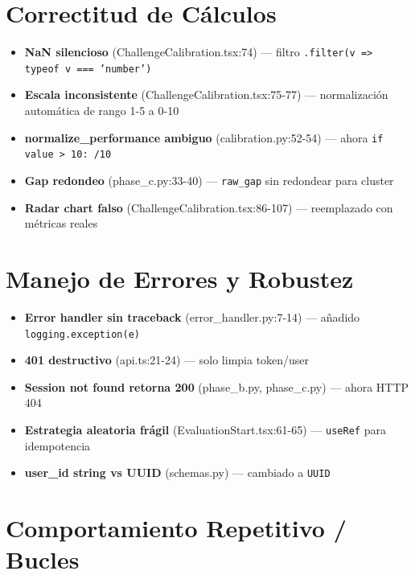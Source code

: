 \documentclass[12pt,a4paper]{article}
\begin{document}
\section{Correctitud de Cálculos}

\begin{itemize}
  \item[\textcolor{orange}{M}] \textbf{NaN silencioso} (ChallengeCalibration.tsx:74) --- filtro \texttt{.filter(v => typeof v === 'number')}
  \item[\textcolor{orange}{M}] \textbf{Escala inconsistente} (ChallengeCalibration.tsx:75-77) --- normalización automática de rango 1-5 a 0-10
  \item[\textcolor{orange}{M}] \textbf{normalize\_performance ambiguo} (calibration.py:52-54) --- ahora \texttt{if value > 10: /10}
  \item[\textcolor{green}{m}] \textbf{Gap redondeo} (phase\_c.py:33-40) --- \texttt{raw\_gap} sin redondear para cluster
  \item[\textcolor{green}{m}] \textbf{Radar chart falso} (ChallengeCalibration.tsx:86-107) --- reemplazado con métricas reales
\end{itemize}

\section{Manejo de Errores y Robustez}

\begin{itemize}
  \item[\textcolor{red}{C}] \textbf{Error handler sin traceback} (error\_handler.py:7-14) --- añadido \texttt{logging.exception(e)}
  \item[\textcolor{orange}{M}] \textbf{401 destructivo} (api.ts:21-24) --- solo limpia token/user
  \item[\textcolor{orange}{M}] \textbf{Session not found retorna 200} (phase\_b.py, phase\_c.py) --- ahora HTTP 404
  \item[\textcolor{orange}{M}] \textbf{Estrategia aleatoria frágil} (EvaluationStart.tsx:61-65) --- \texttt{useRef} para idempotencia
  \item[\textcolor{green}{m}] \textbf{user\_id string vs UUID} (schemas.py) --- cambiado a \texttt{UUID}
\end{itemize}

\section{Comportamiento Repetitivo / Bucles}
\end{document}
